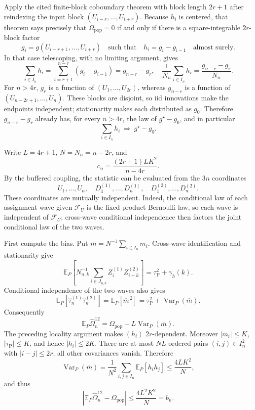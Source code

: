 Apply the cited finite-block coboundary theorem with block length \(2r+1\) after reindexing the input block \((U_{i-r},\ldots,U_{i+r})\).  Because \(h_i\) is centered, that theorem says precisely that \(\Omega_{\mathrm{pop}}=0\) if and only if there is a square-integrable \(2r\)-block factor
\[
 g_i=g(U_{i-r+1},\ldots,U_{i+r})
 \quad\text{such that}\quad h_i=g_i-g_{i-1}\quad\text{almost surely}.
\]
In that case telescoping, with no limiting argument, gives
\[
 \sum_{i\in I_n}h_i
 =\sum_{i=r+1}^{n-r}(g_i-g_{i-1})=g_{n-r}-g_r,
 \quad
 \frac1{N_n}\sum_{i\in I_n}h_i
 =\frac{g_{n-r}-g_r}{N_n}.
\]
For \(n>4r\), \(g_r\) is a function of \((U_1,\ldots,U_{2r})\), whereas \(g_{n-r}\) is a function of \((U_{n-2r+1},\ldots,U_n)\).  These blocks are disjoint, so iid innovations make the endpoints independent; stationarity makes each distributed as \(g_0\).  Therefore \(g_{n-r}-g_r\) already has, for every \(n>4r\), the law of \(g^\star-g_0\), and in particular
\[
 \sum_{i\in I_n}h_i\ \Rightarrow\ g^\star-g_0.
\]

Write \(L=4r+1\), \(N=N_n=n-2r\), and
\[
 c_n=\frac{(2r+1)LK^2}{n-4r}.
\]
By the buffered coupling, the statistic can be evaluated from the \(3n\) coordinates
\[
 U_1,\ldots,U_n,\quad D_1^{(1)},\ldots,D_n^{(1)},\quad
 D_1^{(2)},\ldots,D_n^{(2)}.
\]
These coordinates are mutually independent.  Indeed, the conditional law of each assignment wave given \(\mathcal F_U\) is the fixed product Bernoulli law, so each wave is independent of \(\mathcal F_U\); cross-wave conditional independence then factors the joint conditional law of the two waves.

First compute the bias.  Put \(\overline m=N^{-1}\sum_{i\in I_n}m_i\).  Cross-wave identification and stationarity give
\[
 \mathbb E_P\!\left[N_{n,k}^{-1}\sum_{i\in J_{n,k}}
 Z_i^{(1)}Z_{i+k}^{(2)}\right]
 =\tau_{\mathrm P}^2+\gamma_h(k).
\]
Conditional independence of the two waves also gives
\[
 \mathbb E_P[\widehat\tau_n^{(1)}\widehat\tau_n^{(2)}]
 =\mathbb E_P[\overline m^{\,2}]
 =\tau_{\mathrm P}^2+\operatorname{Var}_P(\overline m).
\]
Consequently
\[
 \mathbb E_P\widehat\Omega_n^{12}
 =\Omega_{\mathrm{pop}}-L\operatorname{Var}_P(\overline m).
\]
The preceding locality argument makes \((h_i)\) \(2r\)-dependent.  Moreover \(|m_i|\le K\), \(|\tau_{\mathrm P}|\le K\), and hence \(|h_i|\le2K\).  There are at most \(NL\) ordered pairs \((i,j)\in I_n^2\) with \(|i-j|\le2r\); all other covariances vanish.  Therefore
\[
 \operatorname{Var}_P(\overline m)
 =\frac1{N^2}\sum_{i,j\in I_n}\mathbb E_P[h_ih_j]
 \le\frac{4LK^2}{N},
\]
and thus
\[
 \left|\mathbb E_P\widehat\Omega_n^{12}-\Omega_{\mathrm{pop}}\right|
 \le\frac{4L^2K^2}{N}=b_n. \tag{1}
\]

